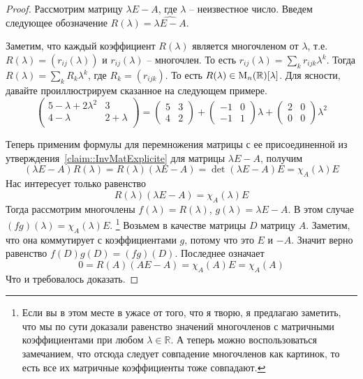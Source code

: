 \begin{proof}
Рассмотрим матрицу $\lambda E - A$, где $\lambda$ -- неизвестное число.
Введем следующее обозначение $R(\lambda) = \widehat{\lambda E - A}$.

Заметим, что каждый коэффициент $R(\lambda)$ является многочленом от $\lambda$, т.е. $R(\lambda) = (r_{ij}(\lambda))$ и $r_{ij}(\lambda)$ -- многочлен.
То есть $r_{ij}(\lambda) = \sum_k r_{ijk}\lambda^k$.
Тогда $R(\lambda) = \sum_k R_k \lambda^k$, где $R_k=(r_{ijk})$.
То есть $R(\lambda)\in\operatorname{M}_{n}(\mathbb R)[\lambda]$.
Для ясности, давайте проиллюстрируем сказанное на следующем примере.
\[
\begin{pmatrix}
{5 - \lambda + 2 \lambda^2}&{3}\\
{4 - \lambda}&{2 + \lambda}\\
\end{pmatrix}
=
\begin{pmatrix}
{5}&{3}\\
{4}&{2}
\end{pmatrix}
+
\begin{pmatrix}
{-1}&{0}\\
{-1}&{1}
\end{pmatrix}
\lambda
+
\begin{pmatrix}
{2}&{0}\\
{0}&{0}
\end{pmatrix}
\lambda^2
\]

Теперь применим формулы для перемножения матрицы с ее присоединенной из утверждения~\ref{claim::InvMatExplicite} для матрицы $\lambda E - A$, получим 
\[
(\lambda E - A)R(\lambda) = R(\lambda)(\lambda E - A) = \det(\lambda E - A)E=\chi_A(\lambda)E
\]
Нас интересует только равенство
\[
R(\lambda)(\lambda E - A) = \chi_A(\lambda)E
\]
Тогда рассмотрим многочлены $f(\lambda) = R(\lambda)$, $g(\lambda) = \lambda E  - A$.
В этом случае $(fg)(\lambda) = \chi_A(\lambda)E$.%
\footnote{Если вы в этом месте в ужасе от того, что я творю, я предлагаю заметить, что мы по сути доказали равенство значений многочленов с матричными коэффициентами при любом $\lambda\in\mathbb R$.
А теперь можно воспользоваться замечанием, что отсюда следует совпадение многочленов как картинок, то есть все их матричные коэффициенты тоже совпадают.}
Возьмем в качестве матрицы $D$ матрицу $A$.
Заметим, что она коммутирует с коэффициентами $g$, потому что это $E$ и $-A$.
Значит верно равенство $f(D)g(D) = (fg)(D)$.
Последнее означает
\[
0 = R(A)(A E - A) = \chi_A(A) E = \chi_A(A)
\]
Что и требовалось доказать.
\end{proof}
